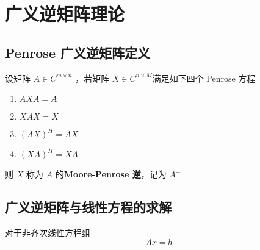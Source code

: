 \chapter{广义逆矩阵理论}
\section{Penrose 广义逆矩阵定义}
设矩阵 $A \in C^{m \times n}$ ，若矩阵 $X \in C^{n \times M}$满足如下四个 Penrose 方程
\begin{enumerate}
    \item $AXA=A$
    \item $XAX=X$
    \item $(AX)^H=AX$
    \item $(XA)^H=XA$
\end{enumerate}
则 $X$ 称为 $A$ 的\textbf{Moore-Penrose 逆}，记为 $A^+$


\section{广义逆矩阵与线性方程的求解}
对于非齐次线性方程组
\begin{equation}
    Ax=b
\end{equation}
